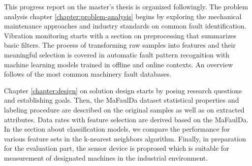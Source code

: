 This progress report on the master's thesis  is organized followingly. The problem analysis chapter \ref{chapter:problem-analysis} begins by exploring the mechanical maintenance approaches and industry standards on common fault identification. Vibration monitoring starts with a section on preprocessing that summarizes basic filters. The process of transforming raw samples into features and their meaningful selection is covered in automatic fault pattern recognition with machine learning models trained in offline and online contexts. An overview follows of the most common machinery fault databases. 

Chapter \ref{chapter:design} on solution design starts by posing research questions and establishing goals. Then, the MaFaulDa dataset statistical properties and labeling procedure are described on the original samples as well as on extracted attributes. Data rates with feature selection are derived based on the MaFaulDa. In the section about classification models, we compare the performance for various feature sets in the k-nearest neighbors algorithm. Finally, in preparation for the evaluation part, the sensor device is proprosed which is suitable for measurement of designated machines in the industrial environment.
